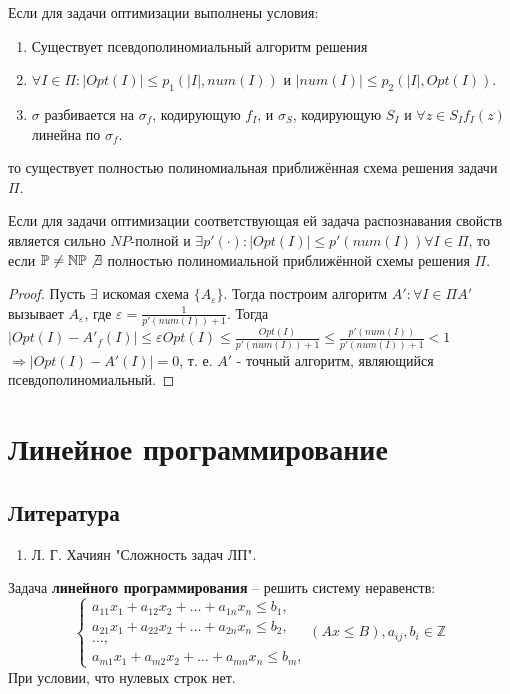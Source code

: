 \documentclass[11pt]{article}
\def\zall{\setcounter{lem}{0}\setcounter{cnsqnc}{0}\setcounter{th}{0}\setcounter{Cmt}{0}\setcounter{equation}{0}\setcounter{stnmt}{0}}
\newcounter{lem}\setcounter{lem}{0}
\newcounter{th}\setcounter{th}{0}
\newcounter{cnsqnc}\setcounter{cnsqnc}{0}
\newcounter{Cmt}\setcounter{Cmt}{0}
\newcounter{stnmt}\setcounter{stnmt}{0}
\def\st{\par\smallskip\refstepcounter{stnmt}\textbf{\arabic{stnmt}}}
\newtheorem*{Statement}{Утверждение \st}
\begin{document}
\begin{Statement}
Если для задачи оптимизации выполнены условия:
\begin{enumerate}
\item Существует псевдополиномиальный алгоритм решения
\item $\forall I \in \Pi: |Opt(I)| \leq p_1(|I|, num(I))$ и $|num(I)| \leq p_2(|I|, Opt(I))$.
\item $\sigma$ разбивается на $\sigma_f$, кодирующую $f_I$, и $\sigma_S$, кодирующую $S_I$ и $\forall z \in S_I f_I(z)$ линейна по $\sigma_f$.
\end{enumerate}
то существует полностью полиномиальная приближённая схема решения задачи $\Pi$.
\end{Statement}
\begin{Statement}
Если для задачи оптимизации соответствующая ей задача распознавания свойств является сильно
$NP$-полной и $\exists p'(\cdot): |Opt(I)| \leq p'(num(I)) \forall I \in \Pi$, то если
$\mathbb{P} \neq \mathbb{NP} \not\exists$ полностью полиномиальной приближённой схемы решения
$\Pi$.
\end{Statement}
\begin{proof}
Пусть $\exists$ искомая схема $\{A_{\varepsilon}\}$. Тогда построим алгоритм $A': \forall I \in \Pi A'$
вызывает $A_{\varepsilon}$, где $\varepsilon = \frac1{p'(num(I)) + 1}$. Тогда
$|Opt(I) - A'_f(I)| \leq \varepsilon Opt(I) \leq \frac{Opt(I)}{p'(num(I)) + 1} \leq \frac{p'(num(I))}{p'(num(I)) + 1} < 1$
$\Rightarrow |Opt(I) - A'(I)| = 0$, т. е. $A'$ - точный алгоритм, являющийся псевдополиномиальный.
\end{proof}
\section{Линейное программирование}
\label{sec:org8f126fe}
\subsection{Литература}
\label{sec:orga32e7e5}
\begin{enumerate}
\item Л. Г. Хачиян "Сложность задач ЛП".
\end{enumerate}

Задача \textbf{линейного программирования} -- решить систему неравенств:
\zall
\begin{equation}
\begin{cases}
a_{11}x_1 + a_{12}x_2 + \ldots + a_{1n}x_n \leq b_1, \\
a_{21}x_1 + a_{22}x_2 + \ldots + a_{2n}x_n \leq b_2, \\
\ldots, \\
a_{m1}x_1 + a_{m2}x_2 + \ldots + a_{mn}x_n \leq b_m,
\end{cases}
(Ax \leq B), a_{ij}, b_i \in \mathbb{Z}
\end{equation}
При условии, что нулевых строк нет.
\end{document}

